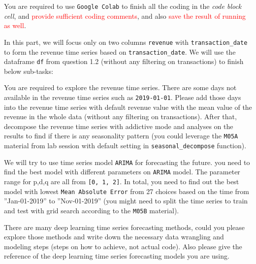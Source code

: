 \documentclass[a4paper]{article}
\begin{document}
    You are required to use \texttt{Google Colab} to
    finish all the coding in the \textit{code block cell},
    and \textcolor{red}{provide sufficient coding comments},
    and also \textcolor{red}{save the result of running as well}.

    In this part, we will focus only on two columns \texttt{revenue} with \texttt{transaction_date} to form the revenue time series based on \texttt{transaction_date}.
    We will use the dataframe \texttt{df} from question 1.2 (without any filtering on transactions) to finish below sub-tasks:


    \begin{answer}[Question 2.1]
    You are required to explore the revenue time series.
    There are some days not available in the revenue time series such as \texttt{2019-01-01}.
    Please add those days into the revenue time series with default revenue value with
    the mean value of the revenue in the whole data (without any filtering on transactions).
    After that, decompose the revenue time series with addictive mode and analyses on the results to find if there is any seasonality pattern (you could leverage the \texttt{M05A} material from lab session with default setting in \texttt{seasonal_decompose} function).

    \end{answer}

    \begin{answer}[Question 2.2]
    We will try to use time series model \texttt{ARIMA} for forecasting the future. you need to find the best model with different parameters on \texttt{ARIMA} model. The parameter range for p,d,q are all from \texttt{[0, 1, 2]}. In total, you need to find out the best model with lowest \texttt{Mean Absolute Error} from 27 choices based on the time from ”Jan-01-2019” to ”Nov-01-2019” (you might need to split the time series to train and test with grid search according to the \texttt{M05B} material).
    \end{answer}

    \begin{answer}[Question 2.3]
    There are many deep learning time series forecasting methods, could you please explore those methods and write down the necessary data wrangling and modeling steps (steps on how to achieve, not actual code). Also please give the reference of the deep learning time series forecasting models you are using.
    \end{answer}
\end{document}
